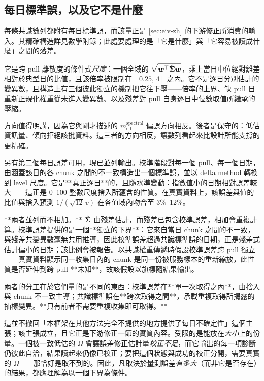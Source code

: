 \documentclass[12pt,a4paper,oneside]{article}
\begin{document}
\subsection{每日標準誤，以及它不是什麼}\label{sec:dailyse-zh}

每條共識數列都附有每日標準誤，而該量正是 \cref{sec:eiv-zh} 的下游修正所消費的輸入。其精確構造詳見數學附錄；此處要處理的是「它是什麼」與「它容易被讀成什麼」之間的落差。

它是跨 pull 離散度的條件式\emph{尺度}：一個全域的 $\sqrt{\bm{w}^{\top}\hat{\bm{\Sigma}}\bm{w}}$，乘上當日中位絕對離差相對於典型日的比值，且該倍率被限制在 $[0.25,\,4]$ 之內。它不是逐日分別估計的變異數，且構造上有三個彼此獨立的機制把它往下壓——倍率的上界、缺 pull 日重新正規化權重從未進入變異數、以及殘差對 pull 自身逐日中位數取值所繼承的壓縮。

方向值得明講，因為它與剛才描述的 $m_{\mathrm{eff}}^{\mathrm{spectral}}$ 偏誤方向相反。後者是保守的：低估資訊量、傾向拒絕該批資料。這三者的方向相反，讓數列看起來比設計所能支撐的更精確。

另有第二個每日誤差可用，現已並列輸出。校準階段對每一個 pull、每一個日期，由涵蓋該日的各 chunk 之間的不一致構造出一個標準誤，並以 delta method 轉換到 level 尺度。它是**真正逐日**的，且隨水準變動：指數值小的日期相對誤差較大——這正是 0--100 整數尺度捨入所蘊含的性質。在真實資料上，該誤差與值的比值與捨入預測 $1/(\sqrt{12}\,v)$ 在各值域內吻合至 3\%--12\%。

**兩者並列而不相加。** $\hat{\bm{\Sigma}}$ 由殘差估計，而殘差已包含校準誤差，相加會重複計算。校準誤差提供的是一個**獨立的下界**：它來自當日 chunk 之間的不一致，與殘差共變異數毫無共用推導，因此校準誤差超過共識標準誤的日期，正是殘差式估計偏小的日期；該比例會被報告。以共識權重傳遞時假設校準誤差跨 pull 獨立——真實資料顯示同一收集日內的 chunk 是同一份被服務樣本的重新縮放，此性質是否延伸到跨 pull **未知**，故該假設以旗標隨結果輸出。

兩者的分工在於它們量的是不同的東西：校準誤差在**單一次取得之內**，由捨入與 chunk 不一致主導；共識標準誤在**跨次取得之間**，承載重複取得所揭露的抽樣變異。**只有前者不需要重複收集即可取得。**

這並不撤回「本框架在其他方法完全不提供的地方提供了每日不確定性」這個主張；該主張成立，且它正是下游修正一節的實質內容。受限的是能放在\emph{大小}上的份量。一個被一致低估的 $\Omega$ 會讓誤差修正估計量\emph{校正不足}，而它輸出的每一項診斷仍彼此自洽，結果讀起來仍像已校正；要把這個狀態與成功的校正分開，需要真實的 $\Omega$——那恰好是取不到的。因此，凡取決於量測誤差\emph{有多大}（而非它是否存在）的結果，都應理解為以一個下界為條件。
\end{document}
